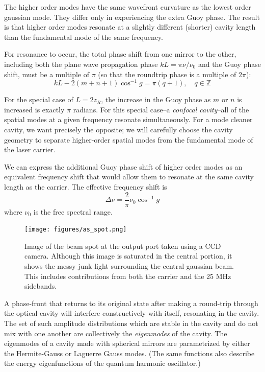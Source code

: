 The higher order modes have the same wavefront curvature as the lowest
order gaussian mode.  They differ only in experiencing the extra Guoy
phase.  The result is that higher order modes resonate at a slightly
different (shorter) cavity length than the fundamental mode of the
same frequency.

For resonance to occur, the total phase shift from one mirror to the
other, including both the plane wave propagation phase
$kL=\pi\nu/\nu_0$ and the Guoy phase shift, must be a multiple of
$\pi$ (so that the roundtrip phase is a multiple of $2\pi$):
%
\begin{equation}
kL - 2\left(m+n+1\right)\cos^{-1} g = \pi(q+1),
\quad q\in\mathbb{Z}
\end{equation}

For the special case of $L = 2 z_R$, the increase in the Guoy phase as
$m$ or $n$ is increased is exactly $\pi$ radians.  For this special
case--a \emph{confocal cavity}--all of the spatial modes at a given
frequency resonate simultaneously.  For a mode cleaner cavity, we want
precisely the opposite; we will carefully choose the cavity geometry
to separate higher-order spatial modes from the fundamental mode of
the laser carrier.

We can express the additional Guoy phase shift of higher order modes
as an equivalent frequency shift that would allow them to resonate at
the same cavity length as the carrier.  The effective frequency shift is
%
\begin{equation}
\Delta\nu = \frac{2}{\pi} \nu_0 \cos^{-1} g
\label{eq:hom-frequency-shift}
\end{equation}
%
where $\nu_0$ is the free spectral range.

\begin{figure}[t]
\centerline{\texttt{[image: figures/as\_spot.png]}}
\caption{\label{fig:as-spot}Image of the beam spot at the output port taken using a CCD
  camera. Although this image is saturated in the central portion, it
  shows the messy junk light surrounding the central gaussian beam.
  This includes contributions from both the carrier and the 25 MHz
  sidebands.}
\end{figure}


A phase-front that returns to its original state after making a
round-trip through the optical cavity will interfere constructively
with itself, resonating in the cavity.  The set of such amplitude
distributions which are stable in the cavity and do not mix with one
another are collectively the \emph{eigenmodes} of the cavity.  The
eigenmodes of a cavity made with spherical mirrors are parametrized by
either the Hermite-Gauss or Laguerre Gauss modes.  (The same functions
also describe the energy eigenfunctions of the quantum harmonic
oscillator.)

